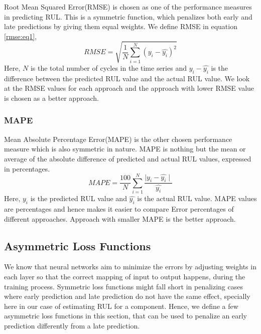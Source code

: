 Root Mean Squared Error(RMSE) is chosen as one of the performance measures in predicting RUL. This is a symmetric function, which penalizes both early and late predictions by giving them equal weights. We define RMSE in equation \ref{rmse:eq1},
\begin{equation} \label{rmse:eq1}
    RMSE = \sqrt{\frac{1}{N}\sum^{N}_{i=1}(y_{i} - \hat{y_{i}})^2}
\end{equation}
Here, $N$ is the total number of cycles in the time series and $y_{i} - \hat{y_{i}}$ is the difference between the predicted RUL value and the actual RUL value. We look at the RMSE values for each approach and the approach with lower RMSE value is chosen as a better approach.

\subsubsection*{MAPE}

Mean Absolute Percentage Error(MAPE) is the other chosen performance measure which is also symmetric in nature. MAPE is nothing but the mean or average of the absolute difference of predicted and actual RUL values, expressed in percentages.
\begin{equation}
    MAPE = \frac{100}{N}\sum^{N}_{i=1}\frac{\mid y_{i} - \hat{y_{i}} \mid}{\hat{y_{i}}}
\end{equation}
Here, $y_{i}$ is the predicted RUL value and $\hat{y_{i}}$ is the actual RUL value. MAPE values are percentages and hence makes it easier to compare Error percentages of different approaches. Approach with smaller MAPE is the better approach.

\subsection{Asymmetric Loss Functions}
\label{sec:rul_estimation:evaluation_setup:asym_loss}
We know that neural networks aim to minimize the errors by adjusting weights in each layer so that the correct mapping of input to output happens, during the training process. Symmetric loss functions might fall short in penalizing cases where early prediction and late prediction do not have the same effect, specially here in our case of estimating RUL for a component. Hence, we define a few asymmetric loss functions in this section, that can be used to penalize an early prediction differently from a late prediction.
